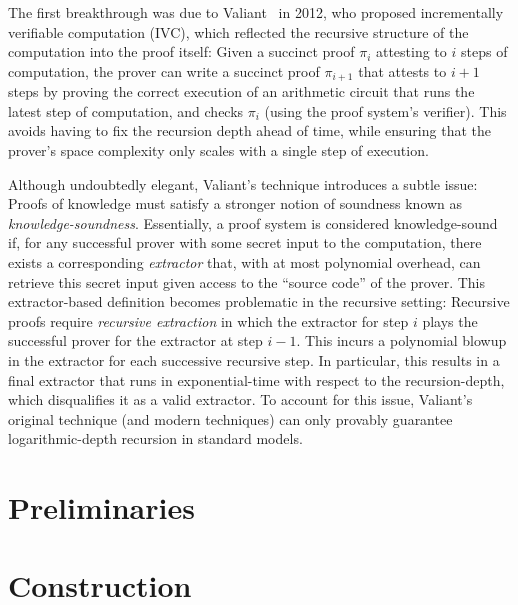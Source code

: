 The first breakthrough was due to Valiant~\cite{valiant} in 2012, 
who proposed incrementally verifiable computation (IVC),
which reflected the recursive structure of the computation
into the proof itself:
%
Given a succinct proof $\pi_{i}$ attesting to $i$ steps of computation,
the prover can write a succinct proof $\pi_{i + 1}$ that attests to $i + 1$ steps
by proving the correct execution of an arithmetic circuit 
that runs the latest step of computation,
and checks $\pi_i$ 
(using the proof system's verifier).
This avoids having to fix the recursion depth ahead of time,
while ensuring that the prover's space complexity only scales with a single step of execution.

Although undoubtedly elegant, 
Valiant's technique introduces a subtle issue:
Proofs of knowledge must satisfy a stronger notion of soundness 
known as \emph{knowledge-soundness}.
%
Essentially,
a proof system is considered knowledge-sound 
if, 
for any successful prover with some secret input to the computation, 
there exists a corresponding \emph{extractor} that,
with at most polynomial overhead,
can retrieve this secret input given access to the ``source code'' of the prover.
%
This extractor-based definition becomes problematic in the recursive setting:
Recursive proofs require \emph{recursive extraction} 
in which the extractor for step $i$ 
plays the successful prover for the extractor at step $i - 1$. 
This incurs a polynomial blowup in the extractor for each successive recursive step. 
In particular, 
this results in a final extractor that runs in exponential-time with respect to the recursion-depth, 
which disqualifies it as a valid extractor. 
%
To account for this issue, 
Valiant's original technique 
(and modern techniques) 
can only provably guarantee logarithmic-depth recursion in standard models.

\section{Preliminaries}







\section{Construction}




